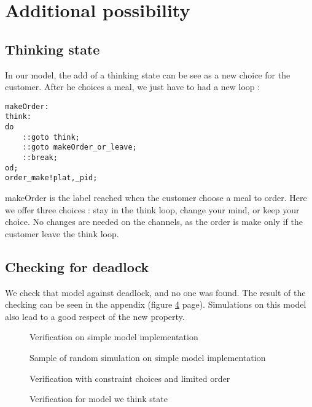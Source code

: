 \documentclass[a4paper,11pt]{article} %
\begin{document}
\newpage
\section{Additional possibility}
\subsection{Thinking state} In our model, the add of a thinking state can be see as a new choice for the customer. After he choices a meal, we just have to had a new loop : 
\begin{lstlisting}
makeOrder:
think:
do
	::goto think;
	::goto makeOrder_or_leave;
	::break;
od;
order_make!plat,_pid;
\end{lstlisting}
makeOrder is the label reached when the customer choose a meal to order. Here we offer three choices : stay in the think loop, change your mind, or keep your choice. No changes are needed on the channels, as the order is make only if the customer leave the think loop.
\subsection{Checking for deadlock}
We check that model against deadlock, and no one was found. The result of the checking can be seen in the appendix (figure \ref{verifC} page\pageref{verifC}). Simulations on this model also lead to a good respect of the new property.
\newpage
\appendix
\tableofcontents
\listoffigures
\begin{figure}
\caption{Verification on simple model implementation\label{verifA}}

\end{figure}
\begin{figure}
\caption{Sample of random simulation on simple model implementation\label{randomA}}

\end{figure}
\begin{figure}
\caption{Verification with constraint choices and limited order\label{verifB}}

\end{figure}
\begin{figure}
\caption{Verification for model we think state\label{verifC}}

\end{figure}
\end{document}
